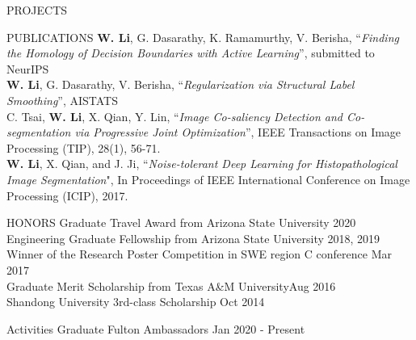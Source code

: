 \documentclass{resume} %
\begin{document}
\begin{rSection}{PROJECTS}
\end{rSection} 

\vspace{-0.1cm}
\begin{rSection}{PUBLICATIONS} \itemsep -3pt  
 \textbf{W. Li}, G. Dasarathy, K. Ramamurthy, V. Berisha, ``\textit{Finding the Homology of Decision Boundaries with Active Learning}'',  submitted to NeurIPS\vspace{+5pt}\\
 \textbf{W. Li}, G. Dasarathy, V. Berisha, ``\textit{Regularization via Structural Label Smoothing}'',  AISTATS\vspace{+5pt}\\
C. Tsai, \textbf{W. Li}, X. Qian, Y. Lin, ``\textit{Image Co-saliency Detection and Co-segmentation via Progressive Joint Optimization}'', IEEE Transactions on Image Processing ({TIP}), 28(1), 56-71. \vspace{+5pt}\\
\textbf{W. Li}, X. Qian, and J. Ji, ``\textit{Noise-tolerant Deep Learning for Histopathological Image Segmentation}", In Proceedings of IEEE International Conference on Image Processing ({ICIP}), 2017.\vspace{+5pt}
\end{rSection}  


\begin{rSection}{HONORS} \itemsep -3pt  
Graduate Travel Award from Arizona State University \hfill 2020\\ 
Engineering Graduate Fellowship from Arizona State University \hfill 2018, 2019\\ 
Winner of the Research Poster Competition in SWE region C conference \hfill Mar 2017\\ 
Graduate Merit Scholarship from Texas A\&M University\hfill Aug 2016\\ 
Shandong University 3rd-class Scholarship \hfill Oct 2014
\end{rSection}  

\begin{rSection}{Activities} 
Graduate Fulton Ambassadors \hfill  Jan 2020 - Present\\ 
\end{rSection}  
\end{document}

